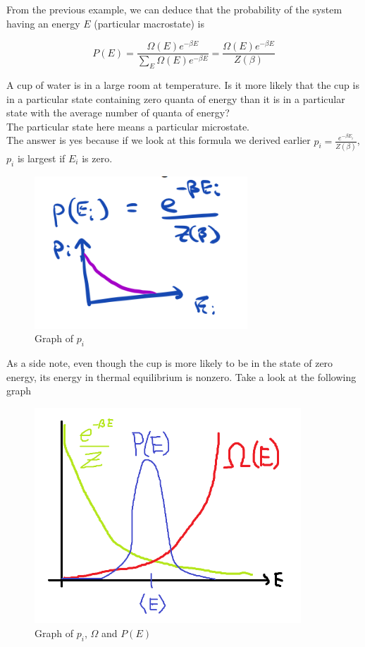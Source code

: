 From the previous example, we can deduce that the probability of the system having an energy $E$ (particular macrostate) is

$$P(E)=\frac{\Omega(E)e^{-\beta E}}{\sum_E \Omega(E)e^{-\beta E}}=\frac{\Omega(E)e^{-\beta E}}{Z(\beta)}$$

\begin{texample}
	A cup of water is in a large room at temperature. Is it more likely that the cup is in a particular state
	containing zero quanta of energy than it is in a particular state with the average number of quanta of energy? \\
	
	The particular state here means a particular microstate. \\
	
	The answer is yes because if we look at this formula we derived earlier $p_i=\frac{e^{-\beta E_i}}{Z(\beta)}$, $p_i$ is largest if $E_i$ is zero.
	
	\begin{figure}[H]
		\centering
		\includegraphics[width=80mm]{16.png}
		\caption{Graph of $p_i$}
	\end{figure}
	
	As a side note, even though the cup is more likely to be in the state of zero energy, its energy in thermal equilibrium is nonzero. Take a look at the following graph
	
	\begin{figure}[H]
		\centering
		\includegraphics[width=100mm]{17.png}
		\caption{Graph of $p_i$, $\Omega$ and $P(E)$}
	\end{figure}
	

\end{texample}
